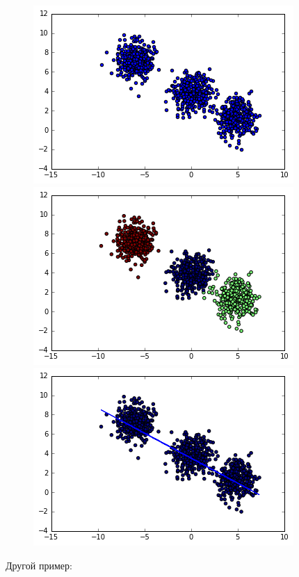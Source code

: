 \begin{figure}[H]
    \centering
    \includegraphics[scale=0.35]{figures/unsupervised_linear.png} 
    \includegraphics[scale=0.35]{figures/unsupervised_gmm.png}
    \includegraphics[scale=0.35]{figures/unsupervised_clustering.png}
   \end{figure}

Другой пример:

